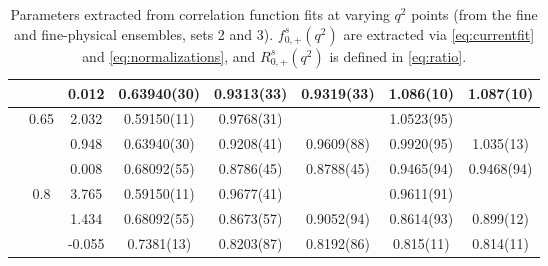 \begin{table}
\begin{center}
\begin{tabular}{ c c c c c c c c }
      &  & 0.012 & 0.63940(30) & 0.9313(33) & 0.9319(33) & 1.086(10) & 1.087(10)\\ [0.5ex]
      \hline 
      & 0.65 & 2.032 & 0.59150(11) & 0.9768(31) &  & 1.0523(95) & \\ [0.5ex]
      &  & 0.948 & 0.63940(30) & 0.9208(41) & 0.9609(88) & 0.9920(95) & 1.035(13)\\ [0.5ex]
      &  & 0.008 & 0.68092(55) & 0.8786(45) & 0.8788(45) & 0.9465(94) & 0.9468(94)\\ [0.5ex]
      \hline 
      & 0.8 & 3.765 & 0.59150(11) & 0.9677(41) &  & 0.9611(91) & \\ [0.5ex]
      &  & 1.434 & 0.68092(55) & 0.8673(57) & 0.9052(94) & 0.8614(93) & 0.899(12)\\ [0.5ex]
      &  & -0.055 & 0.7381(13) & 0.8203(87) & 0.8192(86) & 0.815(11) & 0.814(11)\\ [0.5ex]
      \hline\hline 
    \end{tabular}
    \caption{Parameters extracted from correlation function fits at varying $q^2$ points (from the fine and fine-physical ensembles, sets 2 and 3). $f_{0,+}^s(q^2)$ are extracted via \eqref{eq:currentfit} and \eqref{eq:normalizations}, and $R^s_{0,+}(q^2)$ is defined in \eqref{eq:ratio}. \label{tab:kinetic}}
    \end{center}
\end{table}

